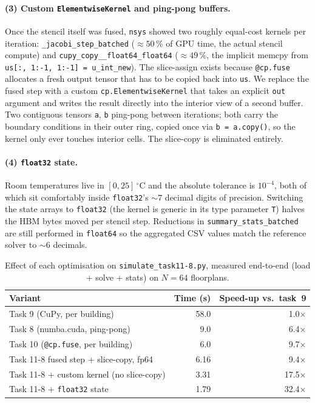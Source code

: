 \paragraph{(3) Custom \texttt{ElementwiseKernel} and ping-pong buffers.}
Once the stencil itself was fused, \verb|nsys| showed two roughly
equal-cost kernels per iteration: \verb|_jacobi_step_batched|
(${\approx}50\,\%$ of GPU time, the actual stencil compute) and
\verb|cupy_copy__float64_float64| (${\approx}49\,\%$, the implicit
memcpy from \verb|us[:, 1:-1, 1:-1] = u_int_new|). The slice-assign
exists because \verb|@cp.fuse| allocates a fresh output tensor that
has to be copied back into \verb|us|.
We replace the fused step with a custom
\verb|cp.ElementwiseKernel| that takes an explicit \verb|out|
argument and writes the result directly into the interior view of a
second buffer. Two contiguous tensors \verb|a|, \verb|b| ping-pong
between iterations; both carry the boundary conditions in their
outer ring, copied once via \verb|b = a.copy()|, so the kernel only
ever touches interior cells. The slice-copy is eliminated entirely.

\paragraph{(4) \texttt{float32} state.}
Room temperatures live in $[0, 25]\,^{\circ}\!\text{C}$ and the
absolute tolerance is $10^{-4}$, both of which sit comfortably
inside \verb|float32|'s ${\sim}7$ decimal digits of precision.
Switching the state arrays to \verb|float32| (the kernel is generic
in its type parameter \verb|T|) halves the HBM bytes moved per
stencil step. Reductions in \verb|summary_stats_batched| are still
performed in \verb|float64| so the aggregated CSV values match the
reference solver to ${\sim}6$ decimals.

\begin{table}[htbp]
  \centering
  \caption{Effect of each optimisation on
           \texttt{simulate\_task11-8.py}, measured end-to-end
           (load + solve + stats) on $N = 64$ floorplans.}
  \label{tab:ex12-opt-trace}
  \begin{tabular}{lrr}
    \toprule
    Variant & Time (s) & Speed-up vs.\ task~9 \\
    \midrule
    Task 9 (CuPy, per building)                  & 58.0  & 1.0$\times$ \\
    Task 8 (numba.cuda, ping-pong)               &  9.0  & 6.4$\times$ \\
    Task 10 (\texttt{@cp.fuse}, per building)    &  6.0  & 9.7$\times$ \\
    Task 11-8 fused step + slice-copy, fp64      &  6.16 & 9.4$\times$ \\
    Task 11-8 + custom kernel (no slice-copy)    &  3.31 & 17.5$\times$ \\
    Task 11-8 + \texttt{float32} state           &  1.79 & 32.4$\times$ \\
    \bottomrule
  \end{tabular}
\end{table}


